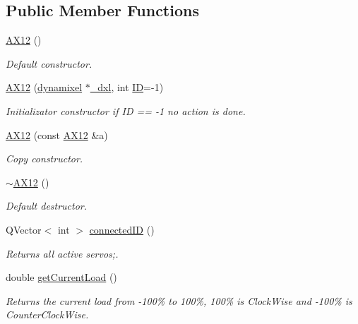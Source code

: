 \subsection*{Public Member Functions}
\begin{DoxyCompactItemize}
\item 
\hyperlink{a00001_ab7c557985e755d6119e5e2d979f928ae}{A\+X12} ()
\begin{DoxyCompactList}\small\item\em Default constructor. \end{DoxyCompactList}\item 
\hyperlink{a00001_a205be9b4dde785bd40b88f575a64f4d8}{A\+X12} (\hyperlink{a00003}{dynamixel} $\ast$\hyperlink{a00001_a16df7ccc0a8d3c585a93b6916734bb17}{\+\_\+dxl}, int \hyperlink{a00001_a08d272b502d65464202a3aa97825aec0ab2565d5698c9d943a8bcecf02b1389ad}{I\+D}=-\/1)
\begin{DoxyCompactList}\small\item\em Initializator constructor if I\+D == -\/1 no action is done. \end{DoxyCompactList}\item 
\hyperlink{a00001_a37b76666533323ec317f5156dbef2a89}{A\+X12} (const \hyperlink{a00001}{A\+X12} \&a)
\begin{DoxyCompactList}\small\item\em Copy constructor. \end{DoxyCompactList}\item 
\hyperlink{a00001_a5e9382e65479cdcb248f5303ac4c96d9}{$\sim$\+A\+X12} ()
\begin{DoxyCompactList}\small\item\em Default destructor. \end{DoxyCompactList}\item 
Q\+Vector$<$ int $>$ \hyperlink{a00001_a2fa05296aa57896a5cb0ef4ce0aa96f1}{connected\+I\+D} ()
\begin{DoxyCompactList}\small\item\em Returns all active servos;. \end{DoxyCompactList}\item 
double \hyperlink{a00001_a0bd930c81b7a9c088ecab789b3a7e525}{get\+Current\+Load} ()
\begin{DoxyCompactList}\small\item\em Returns the current load from -\/100\% to 100\%, 100\% is Clock\+Wise and -\/100\% is Counter\+Clock\+Wise. \end{DoxyCompactList}\item 

\end{DoxyCompactItemize}
